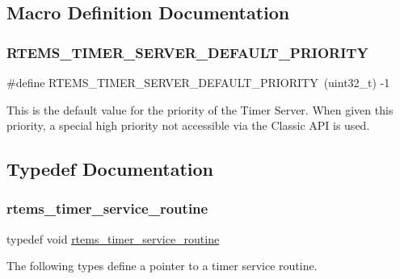 \subsection{Macro Definition Documentation}
\mbox{\label{group__ClassicTimer_gaf60a142a5e7a0d9b0708cb3a6abdffce}} 
\subsubsection{\texorpdfstring{RTEMS\_TIMER\_SERVER\_DEFAULT\_PRIORITY}{RTEMS\_TIMER\_SERVER\_DEFAULT\_PRIORITY}}
{\footnotesize\ttfamily \#define R\+T\+E\+M\+S\+\_\+\+T\+I\+M\+E\+R\+\_\+\+S\+E\+R\+V\+E\+R\+\_\+\+D\+E\+F\+A\+U\+L\+T\+\_\+\+P\+R\+I\+O\+R\+I\+TY~(uint32\+\_\+t) -\/1}

This is the default value for the priority of the Timer Server. When given this priority, a special high priority not accessible via the Classic A\+PI is used. 

\subsection{Typedef Documentation}
\mbox{\label{group__ClassicTimer_gaa5c0d66d51a2f94638228014deb0ee0f}} 
\subsubsection{\texorpdfstring{rtems\_timer\_service\_routine}{rtems\_timer\_service\_routine}}
{\footnotesize\ttfamily typedef void \mbox{\hyperlink{group__ClassicTimer_gaa5c0d66d51a2f94638228014deb0ee0f}{rtems\+\_\+timer\+\_\+service\+\_\+routine}}}

The following types define a pointer to a timer service routine. \mbox{\label{group__ClassicTimer_gab7851346dd520066ddc58a25de671f51}} 
